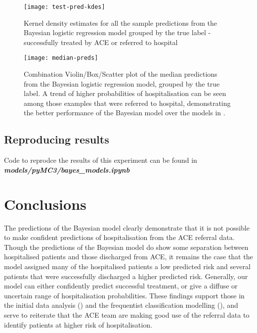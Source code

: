 \begin{figure}[h]
    \centering
    \texttt{[image: test-pred-kdes]}
    \caption[Kernel density estimates for Bayesian predictions]{Kernel density estimates for all the sample predictions from the Bayesian logistic regression model grouped by the true label - successfully treated by ACE or referred to hospital}
    \label{fig:test-pred-kdes}
\end{figure}

\begin{figure}[h]
    \centering
    \texttt{[image: median-preds]}
    \caption[Predictions from Bayesian logistic regression model]{Combination Violin/Box/Scatter plot of the median predictions from the Bayesian logistic regression model, grouped by the true label. A trend of higher probabilities of hospitalisation can be seen among those examples that were referred to hospital, demonstrating the better performance of the Bayesian model over the models in .}
    \label{fig:median-preds}
\end{figure}

\subsection{Reproducing results}\label{subsec:reproducing-results}

Code to reprodce the results of this experiment can be found in \textbf{\textit{models/pyMC3/bayes\_models.ipynb}}

\section{Conclusions}\label{sec:conclusions3}

The predictions of the Bayesian model clearly demonstrate that it is not possible to make confident predictions of hospitalisation from the ACE referral data. Though the predictions of the Bayesian model do show some separation between hospitalised patients and those discharged from ACE, it remains the case that the model assigned many of the hospitalised patients a low predicted risk and several patients that were successfully discharged a higher predicted risk. Generally, our model can either confidently predict successful treatment, or give a diffuse or uncertain range of hospitalisation probabilities. These findings support those in the initial data analysis () and the frequentist classification modelling (), and serve to reiterate that the ACE team are making good use of the referral data to identify patients at higher risk of hospitalisation.

